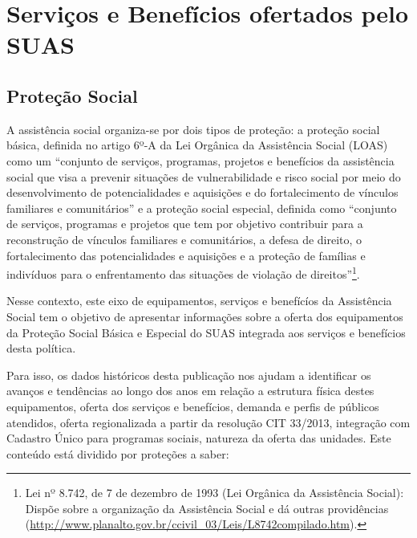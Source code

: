 \documentclass[
  brazilian]{report}
\begin{document}
\hypertarget{serviuxe7os-e-benefuxedcios-ofertados-pelo-suas}{%
\chapter{Serviços e Benefícios ofertados pelo
SUAS}\label{serviuxe7os-e-benefuxedcios-ofertados-pelo-suas}}

\hypertarget{proteuxe7uxe3o-social}{%
\section{Proteção Social}\label{proteuxe7uxe3o-social}}

A assistência social organiza-se por dois tipos de proteção: a proteção
social básica, definida no artigo 6º-A da Lei Orgânica da Assistência
Social (LOAS) como um ``conjunto de serviços, programas, projetos e
benefícios da assistência social que visa a prevenir situações de
vulnerabilidade e risco social por meio do desenvolvimento de
potencialidades e aquisições e do fortalecimento de vínculos familiares
e comunitários'' e a proteção social especial, definida como ``conjunto
de serviços, programas e projetos que tem por objetivo contribuir para a
reconstrução de vínculos familiares e comunitários, a defesa de direito,
o fortalecimento das potencialidades e aquisições e a proteção de
famílias e indivíduos para o enfrentamento das situações de violação de
direitos''\footnote{Lei nº 8.742, de 7 de dezembro de 1993 (Lei Orgânica da Assistência Social): Dispõe sobre a organização da Assistência Social e dá outras providências (\url{http://www.planalto.gov.br/ccivil_03/Leis/L8742compilado.htm}).}.

Nesse contexto, este eixo de equipamentos, serviços e benefícíos da
Assistência Social tem o objetivo de apresentar informações sobre a
oferta dos equipamentos da Proteção Social Básica e Especial do SUAS
integrada aos serviços e benefícios desta política.

Para isso, os dados históricos desta publicação nos ajudam a identificar
os avanços e tendências ao longo dos anos em relação a estrutura física
destes equipamentos, oferta dos serviços e benefícios, demanda e perfis
de públicos atendidos, oferta regionalizada a partir da resolução CIT
33/2013, integração com Cadastro Único para programas sociais, natureza
da oferta das unidades. Este conteúdo está dividido por proteções a
saber:
\end{document}
